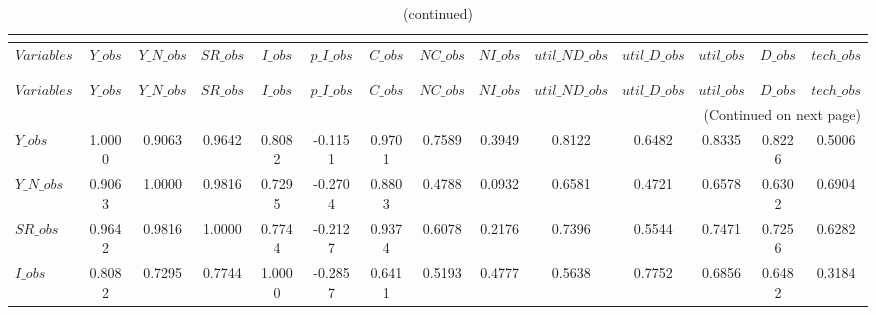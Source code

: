  
\begin{center}
\begin{longtable}{lccccccccccccc} 
\caption{MATRIX OF CORRELATIONS}\\
 \label{Table:th_corr_matrix}\\
\toprule 
$Variables      $	 & 	 $          Y\_obs$	 & 	 $      Y\_N\_obs$	 & 	 $         SR\_obs$	 & 	 $          I\_obs$	 & 	 $      p\_I\_obs$	 & 	 $          C\_obs$	 & 	 $         NC\_obs$	 & 	 $         NI\_obs$	 & 	 $  util\_ND\_obs$	 & 	 $   util\_D\_obs$	 & 	 $       util\_obs$	 & 	 $          D\_obs$	 & 	 $       tech\_obs$\\
\midrule \endfirsthead 
\caption{(continued)}\\
 \toprule \\ 
$Variables      $	 & 	 $          Y\_obs$	 & 	 $      Y\_N\_obs$	 & 	 $         SR\_obs$	 & 	 $          I\_obs$	 & 	 $      p\_I\_obs$	 & 	 $          C\_obs$	 & 	 $         NC\_obs$	 & 	 $         NI\_obs$	 & 	 $  util\_ND\_obs$	 & 	 $   util\_D\_obs$	 & 	 $       util\_obs$	 & 	 $          D\_obs$	 & 	 $       tech\_obs$\\
\midrule \endhead 
\midrule \multicolumn{14}{r}{(Continued on next page)} \\ \bottomrule \endfoot 
\bottomrule \endlastfoot 
$Y\_obs         $	 & 	           1.0000	 & 	           0.9063	 & 	           0.9642	 & 	           0.8082	 & 	          -0.1151	 & 	           0.9701	 & 	           0.7589	 & 	           0.3949	 & 	           0.8122	 & 	           0.6482	 & 	           0.8335	 & 	           0.8226	 & 	           0.5006 \\ 
$Y\_N\_obs      $	 & 	           0.9063	 & 	           1.0000	 & 	           0.9816	 & 	           0.7295	 & 	          -0.2704	 & 	           0.8803	 & 	           0.4788	 & 	           0.0932	 & 	           0.6581	 & 	           0.4721	 & 	           0.6578	 & 	           0.6302	 & 	           0.6904 \\ 
$SR\_obs        $	 & 	           0.9642	 & 	           0.9816	 & 	           1.0000	 & 	           0.7744	 & 	          -0.2127	 & 	           0.9374	 & 	           0.6078	 & 	           0.2176	 & 	           0.7396	 & 	           0.5544	 & 	           0.7471	 & 	           0.7256	 & 	           0.6282 \\ 
$I\_obs         $	 & 	           0.8082	 & 	           0.7295	 & 	           0.7744	 & 	           1.0000	 & 	          -0.2857	 & 	           0.6411	 & 	           0.5193	 & 	           0.4777	 & 	           0.5638	 & 	           0.7752	 & 	           0.6856	 & 	           0.6482	 & 	           0.3184 \\ 

\end{longtable}
\end{center}
